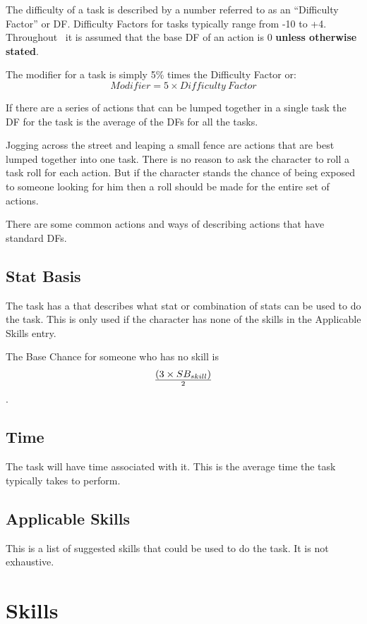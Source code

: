 The difficulty of a task is described by a number 
referred to as an ``Difficulty Factor'' or DF. Difficulty Factors 
for tasks typically range from -10  to +4. Throughout \SH\ it is 
assumed that the base DF of an action is 0 {\bf unless otherwise 
stated}. 

The modifier for a task is simply 5\% times the Difficulty Factor or:
\[ Modifier = 5 \times {Difficulty\ Factor} \]

If there are a series of actions that can be lumped 
together in a single task the DF for the task is the average of the DFs for all the tasks.

Jogging across the street and leaping a small fence are actions that 
are best lumped together into one task. There is no reason 
to ask the character to roll a task roll for each action. 
But if the character stands the chance of being exposed to
someone looking for him then a roll should be made for the entire set 
of actions. 

There are some common actions and ways of describing actions that have
standard DFs.




\subsection{Stat Basis}

The task has a  that describes what stat or combination of 
stats can be used to do the task. This is only used if the character 
has none of the skills in the Applicable Skills entry. 

The Base Chance for someone who has no skill is 
\[ (3 \times SB_{skill}) \over {2} \]. 

\subsection{Time}

The task will have time associated with it. This is the average time 
the task typically takes to perform. 

\subsection{Applicable Skills}

This is a list of suggested skills that could be used to do the task. 
It is not exhaustive.

\section{Skills}

